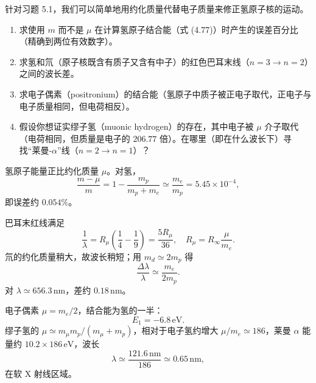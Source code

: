 \begin{question}
针对习题 5.1，我们可以简单地用约化质量代替电子质量来修正氢原子核的运动。
\begin{enumerate}
\item 求使用 $m$ 而不是 $\mu$ 在计算氢原子结合能（式 (4.77)）时产生的误差百分比（精确到两位有效数字）。
\item 求氢和氘（原子核既含有质子又含有中子）的红色巴耳末线（$n=3\to n=2$）之间的波长差。
\item 求电子偶素（positronium）的结合能（氢原子中质子被正电子取代，正电子与电子质量相同，但电荷相反）。
\item 假设你想证实缪子氢（muonic hydrogen）的存在，其中电子被 $\mu$ 介子取代（电荷相同，但质量是电子的 $206.77$ 倍）。在哪里（即在什么波长下）寻找“莱曼-$\alpha$”线（$n=2\to n=1$）？
\end{enumerate}

\par\smallskip
{}

\end{question}
\begin{solution}

氢原子能量正比约化质量 $\mu$。对氢，
\[
\frac{m-
\mu}{m}=1-\frac{m_p}{m_p+m_e}\simeq \frac{m_e}{m_p}=5.45\times10^{-4},
\]
即误差约 $0.054\%$。

巴耳末红线满足
\[
\frac1\lambda=R_\mu\left(\frac14-\frac19\right)=\frac{5R_\mu}{36},
\quad R_\mu=R_\infty\frac{\mu}{m_e}.
\]
氘的约化质量稍大，故波长稍短；用 $m_d\simeq2m_p$ 得
\[
\frac{\Delta\lambda}{\lambda}\simeq \frac{m_e}{2m_p}.
\]
对 $\lambda\simeq656.3\,\mathrm{nm}$，差约 $0.18\,\mathrm{nm}$。

电子偶素 $\mu=m_e/2$，结合能为氢的一半：
\[
E_1=-6.8\,\mathrm{eV}.
\]
缪子氢的 $\mu\simeq m_\mu m_p/(m_\mu+m_p)$，相对于电子氢约增大 $\mu/m_e\simeq186$，莱曼 $\alpha$ 能量约 $10.2\times186\,\mathrm{eV}$，波长
\[
\lambda\simeq\frac{121.6\,\mathrm{nm}}{186}\simeq0.65\,\mathrm{nm},
\]
在软 X 射线区域。

\end{solution}

